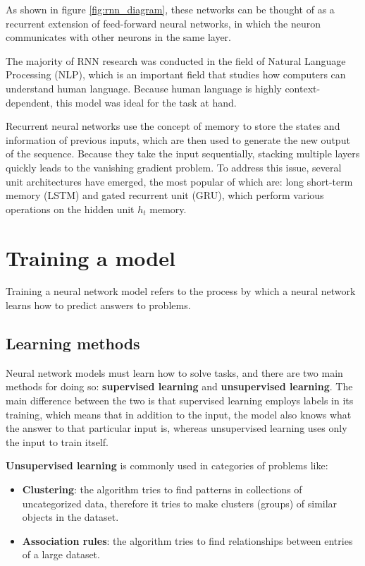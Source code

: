 \documentclass{report}[12pt, a4paper]
\begin{document}
As shown in figure \ref{fig:rnn_diagram}, these networks can be thought of as a recurrent extension of feed-forward neural networks, in which the neuron communicates with other neurons in the same layer.

The majority of RNN research was conducted in the field of Natural Language Processing (NLP), which is an important field that studies how computers can understand human language. Because human language is highly context-dependent, this model was ideal for the task at hand.

Recurrent neural networks use the concept of memory to store the states and information of previous inputs, which are then used to generate the new output of the sequence. Because they take the input sequentially, stacking multiple layers quickly leads to the vanishing gradient problem. To address this issue, several unit architectures have emerged, the most popular of which are: long short-term memory (LSTM) and gated recurrent unit (GRU), which perform various operations on the hidden unit $h_{t}$ memory.

\section{Training a model}

Training a neural network model refers to the process by which a neural network learns how to predict answers to problems.

\subsection{Learning methods}

Neural network models must learn how to solve tasks, and there are two main methods for doing so: \textbf{supervised learning} and \textbf{unsupervised learning}. The main difference between the two is that supervised learning employs labels in its training, which means that in addition to the input, the model also knows what the answer to that particular input is, whereas unsupervised learning uses only the input to train itself.

\textbf{Unsupervised learning} is commonly used in categories of problems like:
\begin{itemize}
    \item \textbf{Clustering}: the algorithm tries to find patterns in collections of uncategorized data, therefore it tries to make clusters (groups) of similar objects in the dataset.
    \item \textbf{Association rules}: the algorithm tries to find relationships between entries of a large dataset.
\end{itemize}
\end{document}
